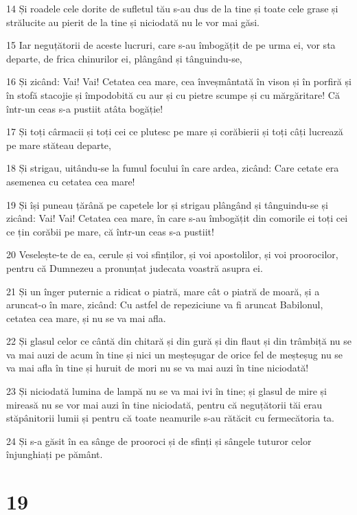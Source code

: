 \par 14 Și roadele cele dorite de sufletul tău s-au dus de la tine și toate cele grase și strălucite au pierit de la tine și niciodată nu le vor mai găsi.
\par 15 Iar neguțătorii de aceste lucruri, care s-au îmbogățit de pe urma ei, vor sta departe, de frica chinurilor ei, plângând și tânguindu-se,
\par 16 Și zicând: Vai! Vai! Cetatea cea mare, cea înveșmântată în vison și în porfiră și în stofă stacojie și împodobită cu aur și cu pietre scumpe și cu mărgăritare! Că într-un ceas s-a pustiit atâta bogăție!
\par 17 Și toți cârmacii și toți cei ce plutesc pe mare și corăbierii și toți câți lucrează pe mare stăteau departe,
\par 18 Și strigau, uitându-se la fumul focului în care ardea, zicând: Care cetate era asemenea cu cetatea cea mare!
\par 19 Și își puneau țărână pe capetele lor și strigau plângând și tânguindu-se și zicând: Vai! Vai! Cetatea cea mare, în care s-au îmbogățit din comorile ei toți cei ce țin corăbii pe mare, că într-un ceas s-a pustiit!
\par 20 Veselește-te de ea, cerule și voi sfinților, și voi apostolilor, și voi proorocilor, pentru că Dumnezeu a pronunțat judecata voastră asupra ei.
\par 21 Și un înger puternic a ridicat o piatră, mare cât o piatră de moară, și a aruncat-o în mare, zicând: Cu astfel de repeziciune va fi aruncat Babilonul, cetatea cea mare, și nu se va mai afla.
\par 22 Și glasul celor ce cântă din chitară și din gură și din flaut și din trâmbiță nu se va mai auzi de acum în tine și nici un meșteșugar de orice fel de meșteșug nu se va mai afla în tine și huruit de mori nu se va mai auzi în tine niciodată!
\par 23 Și niciodată lumina de lampă nu se va mai ivi în tine; și glasul de mire și mireasă nu se vor mai auzi în tine niciodată, pentru că neguțătorii tăi erau stăpânitorii lumii și pentru că toate neamurile s-au rătăcit cu fermecătoria ta.
\par 24 Și s-a găsit în ea sânge de prooroci și de sfinți și sângele tuturor celor înjunghiați pe pământ.

\chapter{19}

